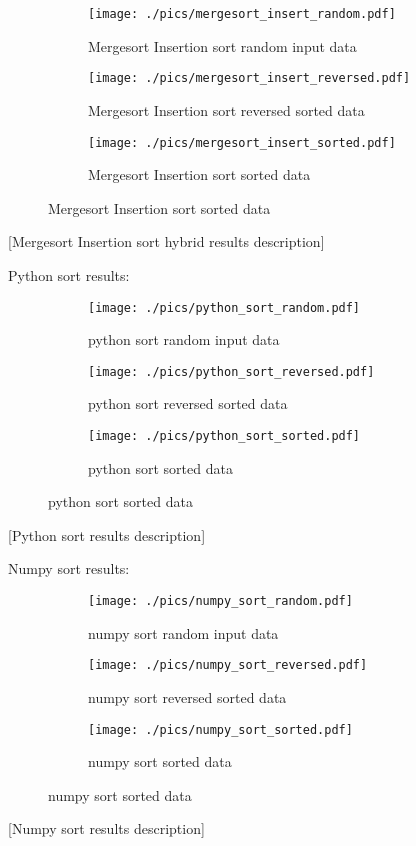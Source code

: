 \begin{figure}[H]
	\centering
	\begin{subfigure}[b]{0.5\textwidth}
		\centering
		\texttt{[image: ./pics/mergesort\_insert\_random.pdf]}
		\caption{Mergesort Insertion sort random input data}
	\end{subfigure}
	\hfill
	\begin{subfigure}[b]{0.5\textwidth}
		\centering
		\texttt{[image: ./pics/mergesort\_insert\_reversed.pdf]}
		\caption{Mergesort Insertion sort reversed sorted data}
	\end{subfigure}
	\hfill
	\begin{subfigure}[b]{0.5\textwidth}
		\centering
		\texttt{[image: ./pics/mergesort\_insert\_sorted.pdf]}
		\caption{Mergesort Insertion sort sorted data}
	\end{subfigure}
\end{figure}

[Mergesort Insertion sort hybrid results description]

Python sort results:

\begin{figure}[H]
	\centering
	\begin{subfigure}[b]{0.5\textwidth}
		\centering
		\texttt{[image: ./pics/python\_sort\_random.pdf]}
		\caption{python sort random input data}
	\end{subfigure}
	\hfill
	\begin{subfigure}[b]{0.5\textwidth}
		\centering
		\texttt{[image: ./pics/python\_sort\_reversed.pdf]}
		\caption{python sort reversed sorted data}
	\end{subfigure}
	\hfill
	\begin{subfigure}[b]{0.5\textwidth}
		\centering
		\texttt{[image: ./pics/python\_sort\_sorted.pdf]}
		\caption{python sort sorted data}
	\end{subfigure}
\end{figure}

[Python sort results description]

Numpy sort results:

\begin{figure}[H]
	\centering
	\begin{subfigure}[b]{0.5\textwidth}
		\centering
		\texttt{[image: ./pics/numpy\_sort\_random.pdf]}
		\caption{numpy sort random input data}
	\end{subfigure}
	\hfill
	\begin{subfigure}[b]{0.5\textwidth}
		\centering
		\texttt{[image: ./pics/numpy\_sort\_reversed.pdf]}
		\caption{numpy sort reversed sorted data}
	\end{subfigure}
	\hfill
	\begin{subfigure}[b]{0.5\textwidth}
		\centering
		\texttt{[image: ./pics/numpy\_sort\_sorted.pdf]}
		\caption{numpy sort sorted data}
	\end{subfigure}
\end{figure}

[Numpy sort results description]